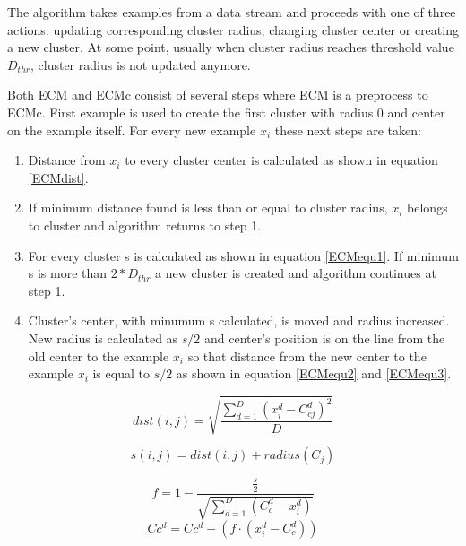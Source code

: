 \documentclass[conference]{IEEEtran}
\begin{document}
The algorithm takes examples from a data stream and proceeds with one of three actions: updating corresponding cluster radius, changing
cluster center or creating a new cluster.
At some point, usually when cluster radius reaches threshold value $D_{thr}$, cluster radius
is not updated anymore.

Both ECM and ECMc consist of several steps where ECM is a preprocess to ECMc. First example is used to create the first cluster
with radius 0 and center on the example itself. For every new example $x_i$ these next steps are taken:
\begin{enumerate}
	\item Distance from $x_i$ to every cluster center is calculated as shown in equation \ref{ECMdist}.
	\item If minimum distance found is less than or equal to cluster radius, $x_i$ belongs to cluster and algorithm returns to step 1.
	\item For every cluster s is calculated as shown in equation \ref{ECMequ1}. If minimum s is more than $2*D_{thr}$ a new cluster
		is created and algorithm continues at step 1.
	\item Cluster's center, with minumum s calculated, is moved and radius increased. New radius is calculated as $s/2$ and
		center's position is on the line from the old center to the example $x_i$ so that distance from the new center to the example $x_i$ is
		equal to $s/2$ as shown in equation \ref{ECMequ2} and \ref{ECMequ3}.
\end{enumerate}

\begin{equation}\label{ECMdist}
dist(i,j) = \sqrt{ \frac {\sum_{d=1}^{D} (x_i^d - C_{cj}^d)^2} {D}}
\end{equation}

\begin{equation}\label{ECMequ1}
s(i, j) = dist(i,j) + radius(C_j)
\end{equation}

\begin{equation}\label{ECMequ2}
f = 1 - \frac {\frac {s} {2}} {\sqrt{ \sum_{d=1}^{D} (C_c^d - x_i^d)}}
\end{equation}
\begin{equation}\label{ECMequ3}
Cc^d = Cc^d + (f \cdot (x_i^d - C_c^d))
\end{equation}
\end{document}
